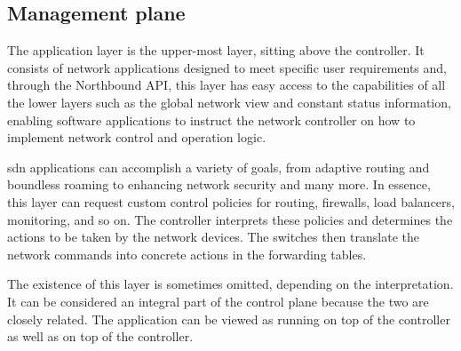 \subsection{Management plane} %
The application layer is the upper-most layer, sitting above the controller. It consists of network applications designed to meet specific user requirements and, through the Northbound API, this layer has easy access to the capabilities of all the lower layers such as the global network view and constant status information, enabling software applications to instruct the network controller on how to implement network control and operation logic\cite{xia_survey_2015}\cite{liatifis_advancing_2023}. 

\gls{sdn} applications can accomplish a variety of goals, from adaptive routing and boundless roaming to enhancing network security and many more\cite{xia_survey_2015}. In essence, this layer can request custom control policies for routing, firewalls, load balancers, monitoring, and so on. The controller interprets these policies and determines the actions to be taken by the network devices. The switches then translate the network commands into concrete actions in the forwarding tables\cite{kreutz_software-defined_2015}. 

The existence of this layer is sometimes omitted, depending on the interpretation. It can be considered an integral part of the control plane because the two are closely related. The application can be viewed as running on top of the controller as well as on top of the controller\cite{peterson_software-defined_2021}.

